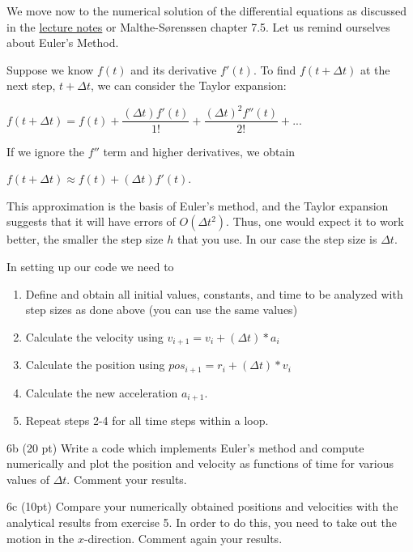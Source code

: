 \documentclass[%
oneside,                 %
final,                   %
10pt]{article}
\begin{document}
\noindent
We move now to the numerical solution of the differential equations as discussed in the \href{{https://mhjensen.github.io/Physics321/doc/pub/motion/html/motion.html}}{lecture notes} or Malthe-Sørenssen chapter 7.5.
Let us remind ourselves about  Euler's Method.

Suppose we know $f(t)$ and its derivative $f'(t)$. To find $f(t+\Delta t)$ at the next step, $t+\Delta t$,
we can consider the Taylor expansion:

$f(t+\Delta t) = f(t) + \dfrac{(\Delta t)f'(t)}{1!} + \dfrac{(\Delta t)^2f''(t)}{2!} + ...$

If we ignore the $f''$ term and higher derivatives, we obtain

$f(t+\Delta t) \approx f(t) + (\Delta t)f'(t)$.

This approximation is the basis of Euler's method, and the Taylor
expansion suggests that it will have errors of $O(\Delta t^2)$.  Thus, one
would expect it to work better, the smaller the step size $h$ that you
use. In our case the step size is $\Delta t$. 

In setting up our code we need to

\begin{enumerate}
 \item Define and obtain all initial values, constants, and time to be analyzed with step sizes as done above (you can use the same values)

 \item Calculate the velocity using $v_{i+1} = v_{i} + (\Delta t)*a_{i}$

 \item Calculate the position using $pos_{i+1} = r_{i} + (\Delta t)*v_{i}$

 \item Calculate the new acceleration $a_{i+1}$.

 \item Repeat steps 2-4 for all time steps within a loop.

\end{enumerate}

\noindent
\item 6b (20 pt) Write a code which implements Euler's method and compute numerically and plot the position and velocity as functions of time for various values of $\Delta t$. Comment your results.


\item 6c (10pt) Compare your numerically obtained positions and velocities with the analytical results from exercise 5. In order to do this, you need to take out the motion in the $x$-direction. Comment again your results.
\end{document}
